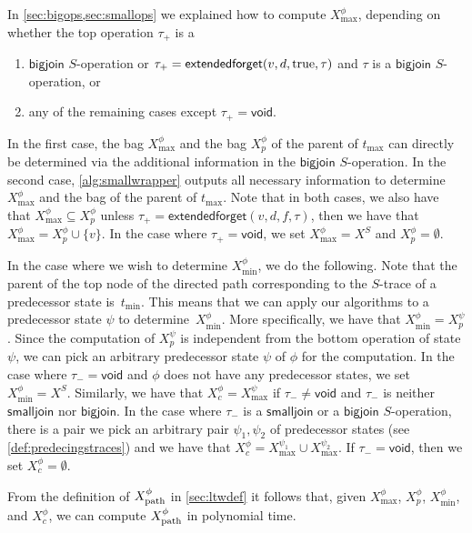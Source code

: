\documentclass[a4paper,UKenglish,cleveref, autoref, thm-restate, numberwithinsect]{lipics-v2021}
\newcounter{algorithm}
\newcommand{\bigjoin}{\mathsf{bigjoin}}
\newcommand{\smalljoin}{\mathsf{smalljoin}}
\newcommand{\extendedforget}{\mathsf{extendedforget}}
\newcommand{\void}{\mathsf{void}}
\newcommand{\dpath}{\textup{path}}
\newcommand{\true}{\textup{true}}
\begin{document}
In \cref{sec:bigops,sec:smallops} we explained how to compute $X^\phi_{\max}$, depending on whether the top operation $\tau_+$ is a 
\begin{enumerate}
\item $\bigjoin$ $S$-operation or $\tau_+=\extendedforget(v,d,\true,\tau)$ and $\tau$ is a $\bigjoin$ $S$-operation, or
\item any of the remaining cases except $\tau_+=\void$.
\end{enumerate}
In the first case, the bag $X^\phi_{\max}$ and the bag $X_p^\phi$ of the parent of $t_{\max}$ can directly be determined via the additional information in the $\bigjoin$ $S$-operation. 
In the second case, \cref{alg:smallwrapper} outputs all necessary information to determine $X^\phi_{\max}$ and the bag of the parent of $t_{\max}$.
Note that in both cases, we also have that $X^\phi_{\max}\subseteq X_p^\phi$ unless $\tau_+=\extendedforget(v,d,f,\tau)$, then we have that $X^\phi_{\max}= X_p^\phi\cup\{v\}$.
In the case where $\tau_+=\void$, we set $X^\phi_{\max}=X^S$ and $X_p^\phi=\emptyset$.

In the case where we wish to determine $X^\phi_{\min}$, we do the following. Note that the parent of the top node of the directed path corresponding to the $S$-trace of a predecessor state is~$t_{\min}$. This means that we can apply our algorithms to a predecessor state $\psi$ to determine~$X^\phi_{\min}$. 
More specifically, we have that $X^\phi_{\min}=X_p^\psi$.
Since the computation of $X_p^\psi$ is independent from the bottom operation of state $\psi$, we can pick an arbitrary predecessor state $\psi$ of $\phi$ for the computation. In the case where $\tau_-=\void$ and $\phi$ does not have any predecessor states, we set $X^\phi_{\min}=X^S$. Similarly, we have that $X^\phi_c=X_{\max}^\psi$ if $\tau_-\neq\void$ and $\tau_-$ is neither $\smalljoin$ nor $\bigjoin$. In the case where $\tau_-$ is a $\smalljoin$ or a $\bigjoin$ $S$-operation, there is a pair we pick an arbitrary pair $\psi_1,\psi_2$ of predecessor states (see \cref{def:predecingstraces}) and we have that $X^\phi_c=X_{\max}^{\psi_1}\cup X_{\max}^{\psi_2}$. If $\tau_-=\void$, then we set $X^\phi_c=\emptyset$.



From the definition of $X^\phi_{\dpath}$ in \cref{sec:ltwdef} it follows that, given $X^\phi_{\max}$, $X^\phi_p$, $X^\phi_{\min}$, and $X^\phi_c$, we can compute $X^\phi_{\dpath}$ in polynomial time.
\end{document}
